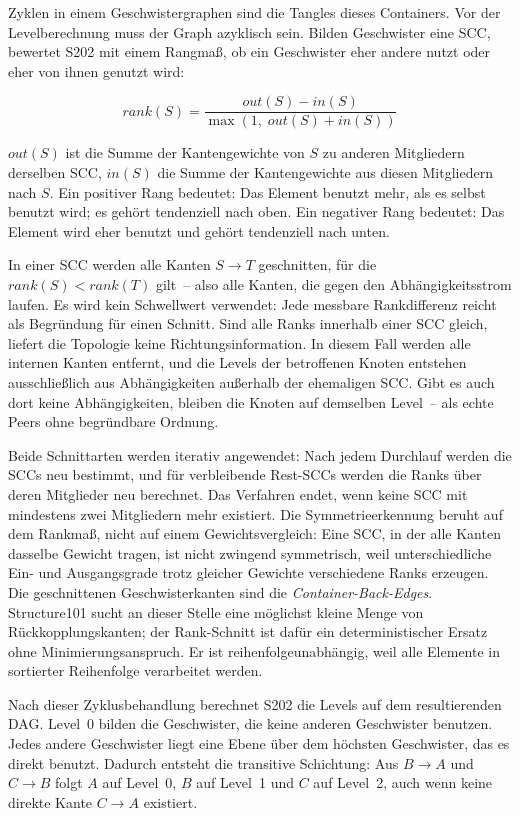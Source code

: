 \documentclass[a4paper,11pt]{article}
\begin{document}
Zyklen in einem Geschwistergraphen sind die Tangles dieses Containers. Vor der
Levelberechnung muss der Graph azyklisch sein. Bilden Geschwister eine SCC,
bewertet S202 mit einem Rangma\ss{}, ob ein Geschwister eher andere nutzt oder
eher von ihnen genutzt wird:

\[
  rank(S) = \frac{out(S) - in(S)}{\max(1,\; out(S) + in(S))}
\]

$out(S)$ ist die Summe der Kantengewichte von $S$ zu anderen Mitgliedern
derselben SCC, $in(S)$ die Summe der Kantengewichte aus diesen Mitgliedern
nach $S$. Ein positiver Rang bedeutet: Das Element benutzt mehr, als es selbst
benutzt wird; es geh\"ort tendenziell nach oben. Ein negativer Rang bedeutet:
Das Element wird eher benutzt und geh\"ort tendenziell nach unten.

In einer SCC werden alle Kanten $S \to T$ geschnitten, f\"ur die
$rank(S) < rank(T)$ gilt~-- also alle Kanten, die gegen den
Abh\"angigkeitsstrom laufen. Es wird kein Schwellwert verwendet: Jede messbare
Rankdifferenz reicht als Begr\"undung f\"ur einen Schnitt. Sind alle Ranks
innerhalb einer SCC gleich, liefert die Topologie keine Richtungsinformation.
In diesem Fall werden alle internen Kanten entfernt, und die Levels der
betroffenen Knoten entstehen ausschlie\ss{}lich aus Abh\"angigkeiten au\ss{}erhalb
der ehemaligen SCC. Gibt es auch dort keine Abh\"angigkeiten, bleiben die
Knoten auf demselben Level~-- als echte Peers ohne begr\"undbare Ordnung.

Beide Schnittarten werden iterativ angewendet: Nach jedem Durchlauf werden die
SCCs neu bestimmt, und f\"ur verbleibende Rest-SCCs werden die Ranks \"uber
deren Mitglieder neu berechnet. Das Verfahren endet, wenn keine SCC mit
mindestens zwei Mitgliedern mehr existiert. Die Symmetrieerkennung beruht auf
dem Rankma\ss{}, nicht auf einem Gewichtsvergleich: Eine SCC, in der alle Kanten
dasselbe Gewicht tragen, ist nicht zwingend symmetrisch, weil unterschiedliche
Ein- und Ausgangsgrade trotz gleicher Gewichte verschiedene Ranks erzeugen.
Die geschnittenen Geschwisterkanten sind die \emph{Container-Back-Edges}.
Structure101 sucht an dieser Stelle eine m\"oglichst kleine Menge von
R\"uckkopplungskanten; der Rank-Schnitt ist daf\"ur ein deterministischer
Ersatz ohne Minimierungsanspruch. Er ist reihenfolgeunabh\"angig, weil alle
Elemente in sortierter Reihenfolge verarbeitet werden.

Nach dieser Zyklusbehandlung berechnet S202 die Levels auf dem resultierenden
DAG. Level~0 bilden die Geschwister, die keine anderen Geschwister benutzen.
Jedes andere Geschwister liegt eine Ebene \"uber dem h\"ochsten Geschwister, das
es direkt benutzt. Dadurch entsteht die transitive Schichtung: Aus $B \to A$
und $C \to B$ folgt $A$ auf Level~0, $B$ auf Level~1 und $C$ auf Level~2, auch
wenn keine direkte Kante $C \to A$ existiert.
\end{document}
